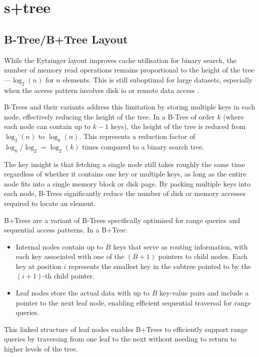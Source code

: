 \section{\texorpdfstring{\ac{s+tree}}{S+tree}}
\label{tb:static_btree}

\subsection{B-Tree/B+Tree Layout}
\label{tb:btree_layout}

While the Eytzinger layout improves cache utilisation for binary search, the number of memory read operations remains proportional to the height of the tree—$\log_2(n)$ for $n$ elements. This is still suboptimal for large datasets, especially when the access pattern involves disk \ac{io} or remote data access \citep{static_b_trees}.

B-Trees and their variants address this limitation by storing multiple keys in each node, effectively reducing the height of the tree. In a B-Tree of order $k$ (where each node can contain up to $k-1$ keys), the height of the tree is reduced from $\log_2(n)$ to $\log_k(n)$. This represents a reduction factor of $\log_k/\log_2 = \log_2(k)$ times compared to a binary search tree.

The key insight is that fetching a single node still takes roughly the same time regardless of whether it contains one key or multiple keys, as long as the entire node fits into a single memory block or disk page. By packing multiple keys into each node, B-Trees significantly reduce the number of disk or memory accesses required to locate an element.

B+Trees are a variant of B-Trees specifically optimised for range queries and sequential access patterns. In a B+Tree:
\begin{itemize}
  \item Internal nodes contain up to $B$ keys that serve as routing information, with each key associated with one of the $(B+1)$ pointers to child nodes. Each key at position $i$ represents the smallest key in the subtree pointed to by the $(i+1)$-th child pointer.
  \item Leaf nodes store the actual data with up to $B$ key-value pairs and include a pointer to the next leaf node, enabling efficient sequential traversal for range queries.
\end{itemize}

This linked structure of leaf nodes enables B+Trees to efficiently support range queries by traversing from one leaf to the next without needing to return to higher levels of the tree.

